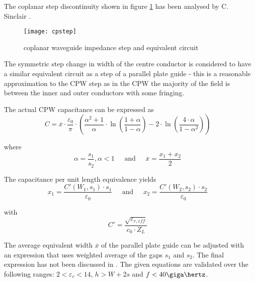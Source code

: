 The coplanar step discontinuity shown in figure \ref{fig:CPWstep} has
been analysed by C. Sinclair \cite{Sinclair}.

\begin{figure}[ht]
\begin{center}
\texttt{[image: cpstep]}
\end{center}
\caption{coplanar waveguide impedance step and equivalent circuit}
\label{fig:CPWstep}
\end{figure}
\FloatBarrier

The symmetric step change in width of the centre conductor is
considered to have a similar equivalent circuit as a step of a
parallel plate guide - this is a reasonable approximation to the CPW
step as in the CPW the majority of the field is between the inner and
outer conductors with some fringing.

\addvspace{12pt}

The actual CPW capacitance can be expressed as
\begin{equation}
C = \overline{x}\cdot \dfrac{\varepsilon_0}{\pi}\cdot\left(\dfrac{\alpha^2 + 1}{\alpha}\cdot \ln{\left(\dfrac{1 + \alpha}{1 - \alpha}\right)} - 2\cdot \ln{\left(\dfrac{4\cdot \alpha}{1 - \alpha^2}\right)}\right)
\end{equation}

where
\begin{equation}
\alpha = \dfrac{s_1}{s_2}, \alpha < 1
\;\;\;\; \textrm{ and } \;\;\;\;
\overline{x} = \dfrac{x_1 + x_2}{2}
\end{equation}

The capacitance per unit length equivalence yields
\begin{equation}
x_1 = \dfrac{C'\left(W_1, s_1\right)\cdot s_1}{\varepsilon_0}
\;\;\;\; \textrm{ and } \;\;\;\;
x_2 = \dfrac{C'\left(W_2, s_2\right)\cdot s_2}{\varepsilon_0}
\end{equation}

with
\begin{equation}
C' = \dfrac{\sqrt{\varepsilon_{r,eff}}}{c_0\cdot Z_L}
\end{equation}

The average equivalent width $\overline{x}$ of the parallel plate
guide can be adjusted with an expression that uses weighted average of
the gaps $s_1$ and $s_2$.  The final expression has not been discussed
in \cite{Sinclair}.  The given equations are validated over the
following ranges: $2 < \varepsilon_r < 14$, $h > W + 2s$ and $f <
40\giga\hertz$.

